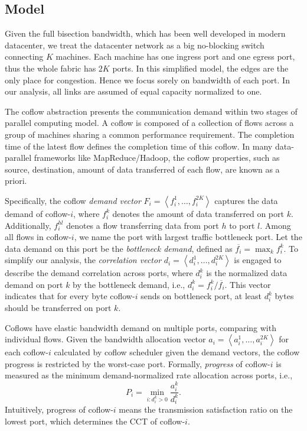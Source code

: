 \documentclass[10pt, conference, letterpaper]{IEEEtran}
\begin{document}
\subsection{Model}
Given the full bisection bandwidth, which has been well developed in modern datacenter\cite{jupiter}, we treat the datacenter network as a big no-blocking switch connecting $K$ machines. Each machine has one ingress port and one egress port, thus the whole fabric has $2K$ ports. In this simplified model, the edges are the only place for congestion. Hence we focus sorely on bandwidth of each port. In our analysis, all links are assumed of equal capacity normalized to one.

The coflow abstraction presents the communication demand within two stages of parallel computing model. A coflow is composed of a collection of flows across a group of machines sharing a common performance requirement. The completion time of the latest flow defines the completion time of this coflow. In many data-parallel frameworks like MapReduce/Hadoop, the coflow properties, such as source, destination, amount of data transferred of each flow, are known as a priori\cite{varys, aalo, bingchuan}.

Specifically, the coflow \emph{demand vector} $F_i = \left\langle f_i^1,\dots,f_i^{2K}\right\rangle$ captures the data demand of coflow-$i$, where $f_i^k$ denotes the amount of data transferred on port $k$. Additionally, $f_i^{hl}$ denotes a flow transferring data from port $h$ to port $l$. Among all flows in coflow-$i$, we name the port with largest traffic bottleneck port. Let the data demand on this port be the \emph{bottleneck demand}, defined as $\overline{f_i}=\max_{k} f_i^k$. To simplify our analysis, the \emph{correlation vector} $d_i = \left\langle d_i^1,\dots,d_i^{2K}\right\rangle$ is engaged to describe the demand correlation across ports, where $d_i^k$ is the normalized data demand on port $k$ by the bottleneck demand, i.e., $d_i^k = f_i^k/\overline{f_i}$. This vector indicates that for every byte coflow-$i$ sends on bottleneck port, at least $d_i^k$ bytes should be transferred on port $k$.
 
Coflows have elastic bandwidth demand on multiple ports, comparing with individual flows. Given the bandwidth allocation vector $a_i=\left\langle a_i^1,\dots,a_i^{2K}\right\rangle$ for each coflow-$i$ calculated by coflow scheduler given the demand vectors, the coflow progress is restricted by the worst-case port. Formally, \emph{progress} of coflow-$i$ is measured as the minimum demand-normalized rate allocation across ports, i.e.,
 \begin{equation}
 	P_i = \min\limits_{i:d_i^k>0}\frac{a_i^k}{d_i^k}.
 \end{equation}
 Intuitively, progress of coflow-$i$ means the transmission satisfaction ratio on the lowest port, which determines the CCT of coflow-$i$.
 
\end{document}
